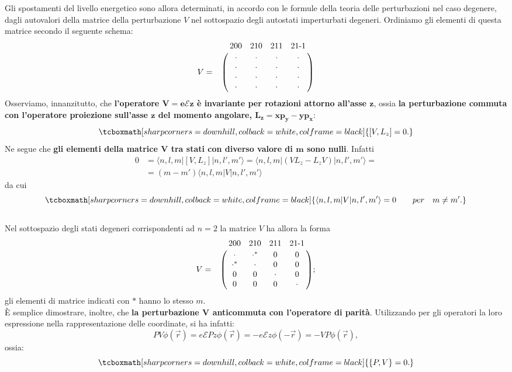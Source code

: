 \documentclass[a4paper,12pt,oneside]{book}
\begin{document}
Gli spostamenti del livello energetico sono allora determinati, in accordo con le formule della teoria delle perturbazioni nel caso degenere, dagli autovalori della matrice della perturbazione $V$ nel sottospazio degli autostati imperturbati degeneri.  Ordiniamo gli elementi di questa matrice secondo il seguente schema:
	\begin{equation}  
		V=
		\bordermatrix{~&200&210&211&21\textrm{-}1\cr
		& \cdot & \cdot & \cdot & \cdot \cr
		& \cdot & \cdot & \cdot & \cdot \cr
		& \cdot & \cdot & \cdot & \cdot \cr
		& \cdot & \cdot & \cdot & \cdot \cr}
		\end{equation}
Osserviamo, innanzitutto, che \textbf{l'operatore $\mathbf{V=e\mathcal{E}z}$ è invariante per rotazioni attorno all'asse $\boldsymbol{z}$}, ossia \textbf{la perturbazione commuta con l'operatore proiezione sull'asse $\boldsymbol{z}$ del momento angolare, $\boldsymbol{L_z=xp_y-yp_x}$}:
	\begin{equation} 
		\tcboxmath[sharp corners=downhill, colback=white, colframe=black]{
			\left[V,L_z\right]=0.
			}
	\end{equation}
Ne segue che \textbf{gli elementi della matrice $\boldsymbol{V}$ tra stati con diverso valore di $\boldsymbol{m}$ sono nulli}. Infatti 
	\begin{align} 
		0 & =  \langle n,l,m| \left[V,L_z\right] |n,l',m'\rangle = \langle n,l,m | \left(VL_z-L_zV\right)|n,l',m'\rangle= \nonumber \\
		 & = \left( m-m' \right) \langle n,l,m |V |n,l',m'\rangle
	\end{align}
da cui
	\begin{equation}
		\tcboxmath[sharp corners=downhill, colback=white, colframe=black]{
			\langle n,l,m | V |n,l',m'\rangle=0 \qquad per \quad m \neq m'.
			}
	\end{equation}\\
	
Nel sottospazio degli stati degeneri corrispondenti ad $n=2$ la matrice $V$ ha allora la forma
	\begin{equation} 
		V=
		\bordermatrix{~&200&210&211&21\textrm{-}1\cr
		& \cdot & \cdot^{*} & 0 & 0 \cr
		& \cdot^{*} & \cdot & 0 & 0 \cr
		& 0 & 0 & \cdot & 0 \cr
		& 0 & 0 & 0 & \cdot \cr} ;
	\end{equation}
gli elementi di matrice indicati con $*$ hanno lo stesso $m$.\\

È semplice dimostrare, inoltre, che \textbf{la perturbazione $\boldsymbol{V}$ anticommuta con l'operatore di parità}. Utilizzando per gli operatori la loro espressione nella rappresentazione delle coordinate, si ha infatti:
	\begin{equation}
		PV\phi(\vec{r})=e\mathcal{E}Pz\phi(\vec{r})=-e\mathcal{E}z\phi(-\vec{r})=-VP\phi(\vec{r}),
	\end{equation}
ossia:
	\begin{equation} 
		\tcboxmath[sharp corners=downhill, colback=white, colframe=black]{
			\{P,V\}=0.
			}
	\end{equation}\\
	
\end{document}
